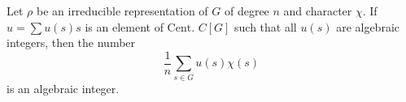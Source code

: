 Let $\rho$ be an irreducible representation of $G$ of degree $n$ and character $\chi$. If $u = \sum u(s)s$ is an element of $\text{Cent. } C[G]$ such that all $u(s)$ are algebraic integers, then the number
$$\frac{1}{n} \sum_{s \in G} u(s)\chi(s)$$
is an algebraic integer.

